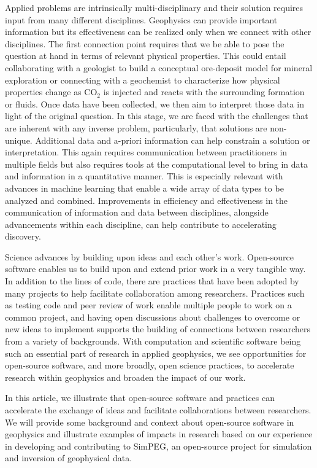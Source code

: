 Applied problems are intrinsically multi-disciplinary and their solution requires input from many different disciplines. Geophysics can provide important information but its effectiveness can be realized only when we connect with other disciplines. The first connection point requires that we be able to pose the question at hand in terms of relevant physical properties. This could entail collaborating with a geologist to build a conceptual ore-deposit model for mineral exploration or connecting with a geochemist to characterize how physical properties change as CO$_2$ is injected and reacts with the surrounding formation or fluids. Once data have been collected, we then aim to interpret those data in light of the original question. In this stage, we are faced with the challenges that are inherent with any inverse problem, particularly, that solutions are non-unique. Additional data and a-priori information can help constrain a solution or interpretation. This again requires communication between practitioners in multiple fields but also requires tools at the computational level to bring in data and information in a quantitative manner. This is especially relevant with advances in machine learning that enable a wide array of data types to be analyzed and combined. Improvements in efficiency and effectiveness in the communication of information and data between disciplines, alongside advancements within each discipline, can help contribute to accelerating discovery.

Science advances by building upon ideas and each other's work. Open-source software enables us to build upon and extend prior work in a very tangible way. In addition to the lines of code, there are practices that have been adopted by many projects to help facilitate collaboration among researchers. Practices such as testing code and peer review of work enable multiple people to work on a common project, and having open discussions about challenges to overcome or new ideas to implement supports the building of connections between researchers from a variety of backgrounds. With computation and scientific software being such an essential part of research in applied geophysics, we see opportunities for open-source software, and more broadly, open science practices, to accelerate research within geophysics and broaden the impact of our work.



In this article, we illustrate that open-source software and practices can accelerate the exchange of ideas and facilitate collaborations between researchers. We will provide some background and context about open-source software in geophysics and illustrate examples of impacts in research based on our experience in developing and contributing to SimPEG, an open-source project for simulation and inversion of geophysical data.

